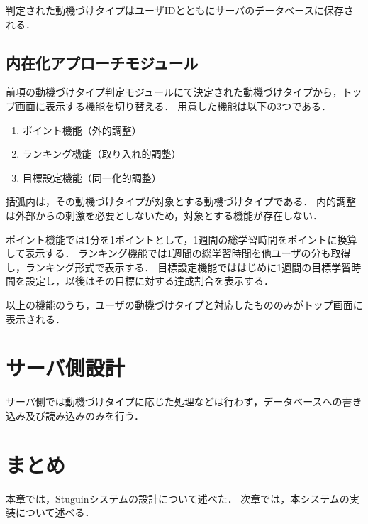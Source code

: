 判定された動機づけタイプはユーザIDとともにサーバのデータベースに保存される．

\subsection{内在化アプローチモジュール}
前項の動機づけタイプ判定モジュールにて決定された動機づけタイプから，トップ画面に表示する機能を切り替える．
用意した機能は以下の3つである．

\begin{enumerate}
  \item ポイント機能（外的調整）
  \item ランキング機能（取り入れ的調整）
  \item 目標設定機能（同一化的調整）
\end{enumerate}

括弧内は，その動機づけタイプが対象とする動機づけタイプである．
内的調整は外部からの刺激を必要としないため，対象とする機能が存在しない．

ポイント機能では1分を1ポイントとして，1週間の総学習時間をポイントに換算して表示する．
ランキング機能では1週間の総学習時間を他ユーザの分も取得し，ランキング形式で表示する．
目標設定機能でははじめに1週間の目標学習時間を設定し，以後はその目標に対する達成割合を表示する．

以上の機能のうち，ユーザの動機づけタイプと対応したもののみがトップ画面に表示される．

\section{サーバ側設計}
サーバ側では動機づけタイプに応じた処理などは行わず，データベースへの書き込み及び読み込みのみを行う．

\section{まとめ}
本章では，Stuguinシステムの設計について述べた．
次章では，本システムの実装について述べる．